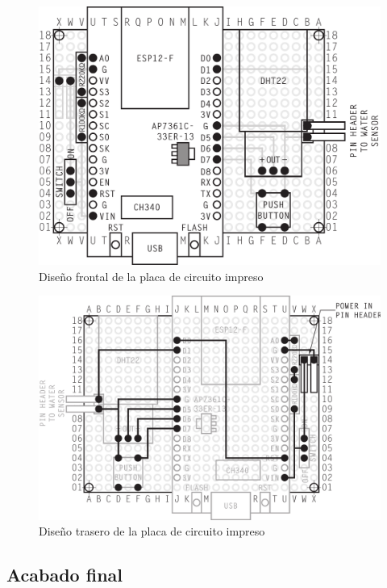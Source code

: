 \begin{figure}[H]
  \centering
  \includegraphics[width=0.9\columnwidth]{../design/exterior-board-front}
  \caption{Diseño frontal de la placa de circuito impreso}
  \label{fig:exterior-board-front}
\end{figure}

\vfill

\clearpage

\begin{figure}
  \centering
  \includegraphics[width=0.9\columnwidth]{../design/exterior-board-back}
  \caption{Diseño trasero de la placa de circuito impreso}
  \label{fig:exterior-board-back}
\end{figure}

\clearpage

\subsection{Acabado final}

